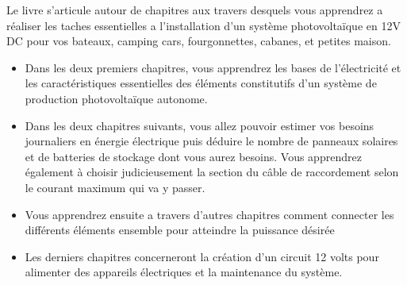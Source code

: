 Le livre s’articule autour de chapitres aux travers desquels vous apprendrez a réaliser les taches essentielles a l’installation d’un système photovoltaïque en 12V DC pour vos bateaux, camping cars, fourgonnettes, cabanes, et petites maison.
\begin{itemize}
\item	Dans les deux premiers chapitres, vous apprendrez les bases de l’électricité et les caractéristiques essentielles des éléments constitutifs d’un système de production photovoltaïque autonome.
\item	Dans les deux chapitres suivants, vous allez pouvoir estimer vos besoins journaliers en énergie électrique puis déduire le nombre de panneaux solaires et de batteries de stockage dont vous aurez besoins. Vous apprendrez également à choisir judicieusement la section du câble de raccordement selon le courant maximum qui va y passer.
\item	Vous apprendrez ensuite a travers d’autres chapitres comment connecter les différents éléments ensemble pour atteindre la puissance désirée
\item	Les derniers chapitres concerneront la création d’un circuit 12 volts pour alimenter des appareils électriques et la maintenance du système.
\end{itemize}

